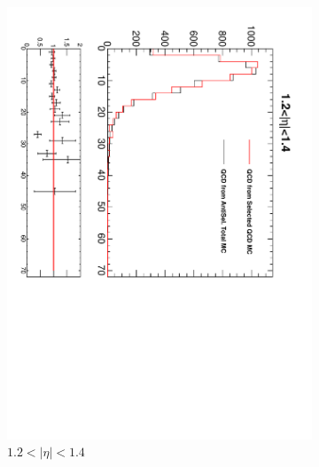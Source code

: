 \begin{figure}[htbp]
\begin{subfigure}{0.4\textwidth}
    \includegraphics*[trim = 0mm 0mm 15mm 0mm, clip, width=\textwidth, angle=90]{MetCompare_anti_eta4.pdf}
    \caption{$1.2<| \eta |<1.4$}
    \label{fig:qcd_met_eta4}
  \end{subfigure}
  \begin{subfigure}{0.4\textwidth}
    \centering

\end{subfigure}
\end{figure}
